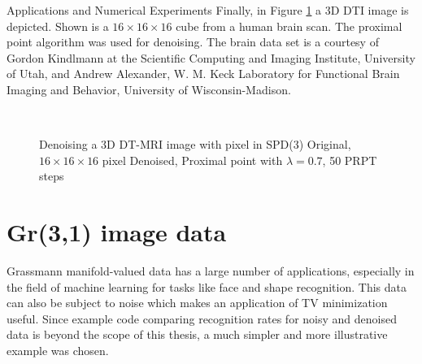 \begin{chapter}{Applications and Numerical Experiments}
Finally, in Figure \ref{fig:application_dti2} a 3D DTI image is depicted. Shown is a $16\times 16\times 16$ cube from a human brain scan. The proximal point algorithm was used for denoising. 
The brain data set is a courtesy of Gordon Kindlmann at the Scientific Computing and Imaging Institute, University of Utah, 
and Andrew Alexander, W. M. Keck Laboratory for Functional Brain Imaging and Behavior, University of Wisconsin-Madison. 
\begin{figure}[h!]
    \centering
    \\
    \caption[Denoising 3D DTI-MRI data]{Denoising a 3D DT-MRI image with pixel in SPD(3)
	 Original, $16\times 16\times 16$ pixel 
	 Denoised, Proximal point with $\lambda=0.7$, 50 PRPT steps
	\label{fig:application_dti2}
    }
\end{figure}

\FloatBarrier
\section{Gr(3,1) image data} %
\label{sec:Gr31imagedata}
Grassmann manifold-valued data has a large number of applications, especially in the field of machine learning
for tasks like face and shape recognition. This data can also be subject to noise which makes an application
of TV minimization useful. Since example code comparing recognition rates for noisy and denoised data is
beyond the scope of this thesis, a much simpler and more illustrative example was chosen. \\


\end{chapter}
